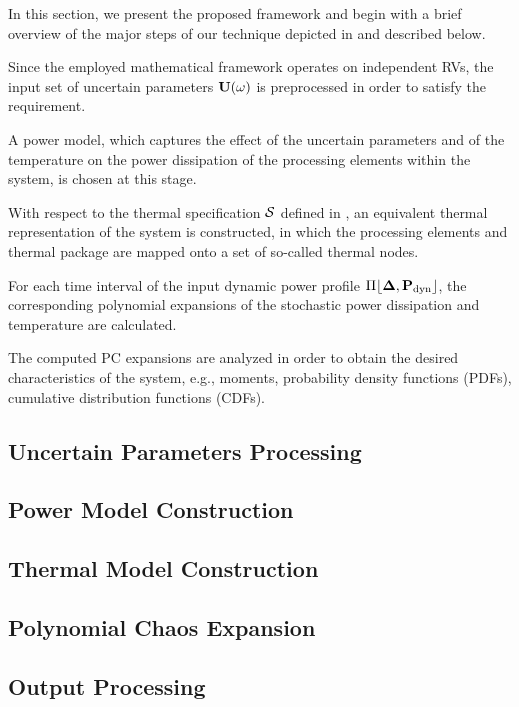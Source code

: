 In this section, we present the proposed framework and begin with a brief overview of the major steps of our technique depicted in  and described below.

 Since the employed mathematical framework operates on independent RVs, the input set of uncertain parameters $\mathbf{U}(\omega)$ is preprocessed in order to satisfy the requirement.

 A power model, which captures the effect of the uncertain parameters and of the temperature on the power dissipation of the processing elements within the system, is chosen at this stage.

 With respect to the thermal specification $\mathcal{S}$ defined in , an equivalent thermal representation of the system is constructed, in which the processing elements and thermal package are mapped onto a set of so-called thermal nodes.

 For each time interval of the input dynamic power profile $\profPdyn$, the corresponding polynomial expansions of the stochastic power dissipation and temperature are calculated.

 The computed PC expansions are analyzed in order to obtain the desired characteristics of the system, e.g., moments, probability density functions (PDFs), cumulative distribution functions (CDFs).

\subsection{Uncertain Parameters Processing} 


\subsection{Power Model Construction} 


\subsection{Thermal Model Construction} 


\subsection{Polynomial Chaos Expansion} 


\subsection{Output Processing} 

